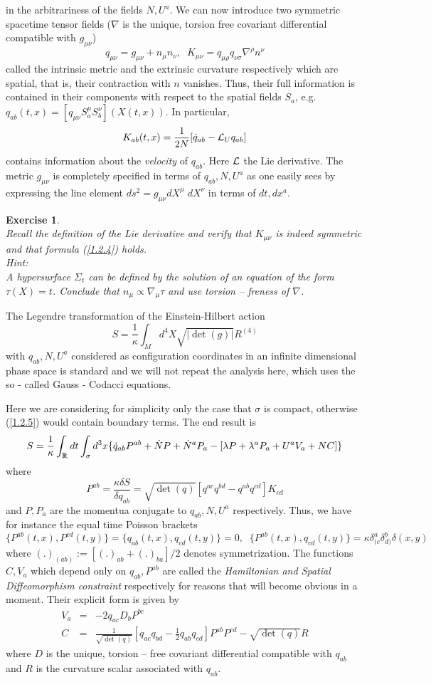 \documentclass[12pt]{report}
\newtheorem{Exercise}{Exercise}[section]
\def\be{\begin{equation}}
\def\ee{\end{equation}}
\def\ba{\begin{eqnarray}}
\def\ea{\end{eqnarray}}
\def\Rl{{\mathchoice
{\setbox0=\hbox{$\displaystyle\rm R$}\hbox{\hbox to0pt
{\kern0.4\wd0\vrule height0.9\ht0\hss}\box0}}
{\setbox0=\hbox{$\textstyle\rm R$}\hbox{\hbox to0pt
{\kern0.4\wd0\vrule height0.9\ht0\hss}\box0}}
{\setbox0=\hbox{$\scriptstyle\rm R$}\hbox{\hbox to0pt
{\kern0.4\wd0\vrule height0.9\ht0\hss}\box0}}
{\setbox0=\hbox{$\scriptscriptstyle\rm R$}\hbox{\hbox to0pt
{\kern0.4\wd0\vrule height0.9\ht0\hss}\box0}}}}
\begin{document}
in the arbitrariness of the fields $N,U^a$.
We can now introduce two 
symmetric spacetime tensor fields ($\nabla$ is the unique, torsion free 
covariant differential compatible with $g_{\mu\nu}$)
\be \label{1.2.3}
q_{\mu\nu}=g_{\mu\nu}+n_\mu n_\nu,\;\;
K_{\mu\nu}=
q_{\mu\rho} q_{\nu\sigma} \nabla^\rho n^\nu
\ee
called the intrinsic metric and the extrinsic curvature respectively which
are spatial, that is, their contraction with $n$ vanishes. Thus, their 
full information is contained in their components with respect to the spatial
fields $S_a$, e.g. $q_{ab}(t,x)=[q_{\mu\nu} S^\mu_a S^\nu_b](X(t,x))$.
In particular,
\be \label{1.2.4}
K_{ab}(t,x)=\frac{1}{2N}[\dot{q}_{ab}-{\cal L}_U q_{ab}]
\ee
contains information about the {\it velocity} of $q_{ab}$.
Here $\cal L$ the Lie 
derivative. The metric $g_{\mu\nu}$ is completely specified in terms 
of $q_{ab},N,U^a$ as one easily sees by expressing the line 
element $ds^2=g_{\mu\nu} dX^\mu\; dX^\nu$ in terms of $dt,dx^a$.
%
\begin{Exercise} \label{ex1.2.0} ~\\
Recall the definition of the Lie derivative and 
verify that $K_{\mu\nu}$ is indeed symmetric and that formula (\ref{1.2.4})
holds.\\
Hint:\\
A hypersurface $\Sigma_t$ can be defined by the solution of an equation of 
the form $\tau(X)=t$. Conclude that $n_\mu\propto \nabla_\mu\tau$ and 
use torsion -- freness of $\nabla$.
\end{Exercise}
%
The Legendre transformation of the Einstein-Hilbert action
\be \label{1.2.5}
S=\frac{1}{\kappa}\int_M d^4X \sqrt{|\det(g)|} R^{(4)}
\ee
with $q_{ab},N,U^a$ considered as configuration coordinates in an 
infinite dimensional phase space is standard and we will not repeat 
the analysis here, which uses the so - called Gauss - Codacci equations. 

Here we are considering for 
simplicity only the case that $\sigma$ is compact, otherwise (\ref{1.2.5})
would contain boundary terms. The end result is 
\be \label{1.2.6}
S=\frac{1}{\kappa}\int_\Rl dt \int_\sigma 
d^3x \{\dot{q}_{ab} P^{ab}+\dot{N} P+\dot{N}^a P_a-
[\lambda P+\lambda^a P_a+U^a V_a+N C]\}
\ee
where 
\be \label{1.2.7}
P^{ab}=\frac{\kappa\delta S}{\delta q_{ab}}=\sqrt{\det(q)}
[q^{ac} q^{bd}-q^{ab} q^{cd}] K_{cd}
\ee
and $P,P_a$ are the momentua conjugate to $q_{ab},N,U^a$ respectively.
Thus, we have for instance the equal time Poisson brackets
\be \label{1.2.7a}
\{P^{ab}(t,x),P^{cd}(t,y)\}=\{q_{ab}(t,x),q_{cd}(t,y)\}=0,\;\;
\{P^{ab}(t,x),q_{cd}(t,y)\}=\kappa 
\delta^a_{(c} \delta^b_{d)} \delta(x,y)
\ee
where $(.)_{(ab)}:=[(.)_{ab}+(.)_{ba}]/2$ denotes symmetrization.
The functions $C,V_a$ which depend only on $q_{ab},P^{ab}$ are called the 
{\it Hamiltonian and Spatial Diffeomorphism constraint} respectively for 
reasons 
that will become obvious in a moment. Their explicit form is given by
\ba \label{1.2.7b}
V_a &=& -2 q_{ac} D_b P^{bc} \nonumber\\
C &=& \frac{1}{\sqrt{\det(q)}}
[q_{ac} q_{bd}-\frac{1}{2} q_{ab} q_{cd}] P^{ab} P^{cd}-
\sqrt{\det(q)} R
\ea
where $D$ is the unique, torsion -- free covariant differential 
compatible with $q_{ab}$ and $R$ is the curvature scalar associated with 
$q_{ab}$.
\end{document}
